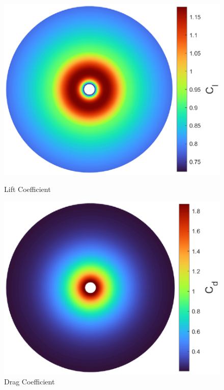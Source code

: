 {\begin{figure}[!htb]
    \centering
    \begin{minipage}{.49\textwidth}
      \centering
      \includegraphics[width=\textwidth]{Figures/comp_method/sim_B/cl.eps}
      \caption[Lift Coefficient]{Lift Coefficient}
      \label{fig:imagem11}
    \end{minipage}%
    \begin{minipage}{.01\textwidth}
         \hfill
    \end{minipage}
    \begin{minipage}{.49\textwidth}
      \centering
      \includegraphics[width=\textwidth]{Figures/comp_method/sim_B/cd.eps}
      \caption[Drag Coefficient]{Drag Coefficient}
      \label{fig:imagem31}
    \end{minipage}
\end{figure}


}
